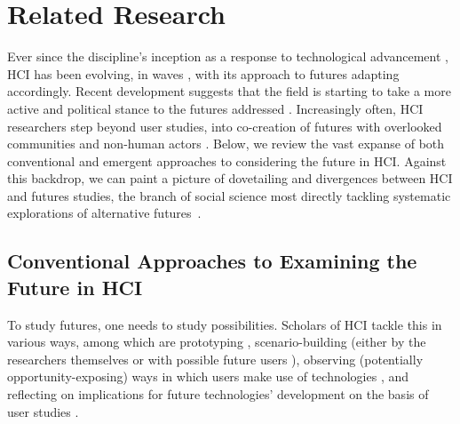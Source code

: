\section{Related Research}
\label{sec:related-research}

Ever since the discipline's inception as a response to technological advancement \cite{baecker_timelines_2008}, HCI has been evolving, in waves \cite{harrison_making_2011, bodkerWhenSecondWave2006, bodker_third-wave_2015, frauenbergerEntanglementHCINext2019}, with its approach to futures adapting accordingly.  
Recent development suggests that the field is starting to take a more active and political stance to the futures addressed \cite{ashby_fourth-wave_2019}. 
Increasingly often, HCI researchers step beyond user studies, into co-creation of futures with overlooked communities \cite{harrington_eliciting_2021, freeman_rediscovering_2022} and non-human actors \cite{liu_design_2018, reddy_making_2021, heitlingerAlgorithmicFoodJustice2021}.
Below, we review the vast expanse of both conventional and emergent approaches to considering the future in HCI. Against this backdrop, we can paint a picture of dovetailing and divergences between HCI and futures studies, the branch of social science most directly tackling systematic explorations of alternative futures~\cite{bellWhatWeMean1996}.

\subsection{Conventional Approaches to Examining the Future in HCI}
To study futures, one needs to study possibilities. Scholars of HCI tackle this in various ways, among which are prototyping \cite{limAnatomyPrototypesPrototypes2008}, scenario-building (either by the researchers themselves or with possible future users \cite{carroll_making_2003, stromberg2004interactive, epp2022reinventing}), observing (potentially opportunity-exposing) ways in which users make use of technologies \cite{norman2008workarounds,norman2013incremental}, and reflecting on implications for future technologies' development on the basis of user studies \cite{luria_re-embodiment_2019}. 

